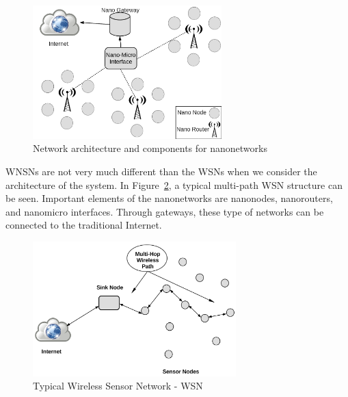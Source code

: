 \documentclass[12pt, oneandhalf, chaparabic, sees, ms]{metu}
\begin{document}
% 
%
%

\begin{figure}[!htbp]
\begin{center}
  \includegraphics[width=0.65\textwidth]{myarch.png}
   \end{center}
  \caption{Network architecture and components for nanonetworks}
 \label{fig:arch}
\end{figure}
% 
%
%







WNSNs are not very much different than the WSNs when we consider the architecture of the system.
In Figure~\ref{fig:wsn-arch}, a typical multi-path WSN structure can be seen.
Important elements of the nanonetworks are nanonodes, 
nanorouters, and nanomicro interfaces. Through gateways, these type of networks can be connected to the traditional Internet.


\begin{figure}[!htbp]
\begin{center}
  \includegraphics[width=0.7\textwidth]{wsn-graph.png}
    \end{center}
  \caption{Typical Wireless Sensor Network - WSN}
 \label{fig:wsn-arch}
\end{figure}
\end{document}
